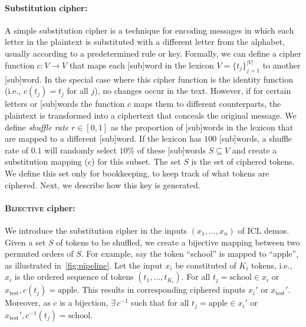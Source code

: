 \documentclass[11pt]{article}
\newcommand{\aayush}[1]{{\color{green}[{\bf Aayush}: #1]}}
\begin{document}
\paragraph{Substitution cipher:}
\label{sec:sub-cipher}
A simple substitution cipher is a technique for encoding messages in which each letter in the plaintext is substituted with a different letter from the alphabet, usually according to a predetermined rule or key. Formally, we can define a cipher function \( c: V \rightarrow V \) that maps each [sub]word in the lexicon \( V = \{t_j\}_{j=1}^{|V|} \) to another [sub]word. In the special case where this cipher function is the identity function (i.e., \( c(t_j) = t_j \) for all \( j \)), no changes occur in the text.
However, if for certain letters or [sub]words the function \( c \) maps them to different counterparts, the plaintext is transformed into a ciphertext that conceals the original message. We define \textit{shuffle rate} $r \in [0, 1]$ as the proportion of [sub]words in the lexicon that are mapped to a different [sub]word. If the lexicon has $100$ [sub]words, a shuffle rate of $0.1$ will randomly select $10\%$ of these [sub]words \(S \subseteq V\) and create a substitution mapping ($c$) for this subset.
The set $S$ is the set of ciphered tokens. We define this set only for bookkeeping, to keep track of what tokens are ciphered.
Next, we describe how this key is generated.


\paragraph{\textsc{Bijective} cipher:}
We introduce the substitution cipher in the inputs $(x_1, \hdots, x_n)$ of ICL demos.
Given a set $S$ of tokens to be shuffled, we create a bijective mapping between two permuted orders of $S$.
For example, say the token ``school'' is mapped to ``apple'', as illustrated in~\autoref{fig:pipeline}.
Let the input $x_i$ be constituted of $K_i$ tokens, i.e., $x_i$ is the ordered sequence of tokens $(t_1, \hdots, t_{K_i})$.
For all $t_j = \text{school} \in x_i$ or $x_\text{test}, c(t_j) = \text{apple}$. This results in corresponding ciphered inputs $x_i'$ or $x_\text{test}'$. Moreover, as $c$ is a bijection, $\exists\hspace{2pt}c^{-1}$ such that for all $t_j = \text{apple} \in x_i'$ or $x_\text{test}', c^{-1}(t_j) = \text{school}$.
\end{document}
